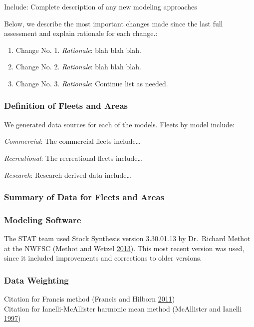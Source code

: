 \documentclass[12pt,]{article}
\begin{document}
Include: Complete description of any new modeling approaches

Below, we describe the most important changes made since the last full
assessment and explain rationale for each change.:

\begin{enumerate}
\def\labelenumi{\arabic{enumi}.}
\item
  Change No. 1. \emph{Rationale}: blah blah blah.
\item
  Change No. 2. \emph{Rationale}: blah blah blah.
\item
  Change No. 3. \emph{Rationale}: Continue list as needed.
\end{enumerate}

\subsubsection{Definition of Fleets and
Areas}\label{definition-of-fleets-and-areas}

We generated data sources for each of the models. Fleets by model
include:

\emph{Commercial}: The commercial fleets include\ldots{}

\emph{Recreational}: The recreational fleets include\ldots{}

\emph{Research}: Research derived-data include\ldots{}

\subsubsection{Summary of Data for Fleets and
Areas}\label{summary-of-data-for-fleets-and-areas}

\subsubsection{Modeling Software}\label{modeling-software}

The STAT team used Stock Synthesis version 3.30.01.13 by Dr.~Richard
Methot at the NWFSC (Methot and Wetzel
\protect\hyperlink{ref-methot_stock_2013}{2013}). This most recent
version was used, since it included improvements and corrections to
older versions.

\subsubsection{Data Weighting}\label{data-weighting}

Citation for Francis method (Francis and Hilborn
\protect\hyperlink{ref-francis_data_2011}{2011})\\
Citation for Ianelli-McAllister harmonic mean method (McAllister and
Ianelli \protect\hyperlink{ref-mcallister_bayesian_1997}{1997})
\end{document}
